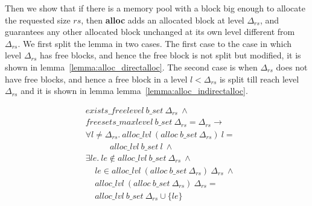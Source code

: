 Then we show that if there is a memory pool with a block big enough to allocate the requested size $rs$, then \textbf{alloc} adds an allocated block at level $\Delta_{rs}$, and guarantees any other allocated block unchanged at its own level different from $\Delta_{rs}$. We first split the lemma in two cases. The first case to the case in which level $\Delta_{rs}$ has free blocks, and hence the free block is not split but modified, it is shown in lemma~\ref{lemma:alloc_directalloc}. The second case is when $\Delta_{rs}$ does not have free blocks, and hence a free block in a level $l < \Delta_{rs}$ is split till reach level $\Delta_{rs}$ and it is shown in lemma lemma~\ref{lemma:alloc_indirectalloc}.


\begin{lemma} 
\label{lemma:alloc_directalloc}
\end{lemma}
\vspace{-7pt}
\begin{align*}
&exists\_freelevel\ b\_set\ \Delta_{rs}\ \wedge\\
&freesets\_maxlevel\ b\_set\ \Delta_{rs} = \Delta_{rs} \longrightarrow\\
&\forall l \ne \Delta_{rs}.\ alloc\_lvl\ (alloc\ b\_set\ \Delta_{rs})\ l =\\
&\ \ \ \ \ \ \ \ \ \ \ \ \ alloc\_lvl\ b\_set\ l\ \wedge\\
&\exists le.\ le \notin alloc\_lvl\ b\_set\ \Delta_{rs}\ \wedge\\
&\ \ \ \ \ le \in alloc\_lvl\ (alloc\ b\_set\ \Delta_{rs})\ \Delta_{rs}\ \wedge\\
&\ \ \ \ \ alloc\_lvl\ (alloc\ b\_set\ \Delta_{rs})\ \Delta_{rs} =\\
&\ \ \ \ \ alloc\_lvl\ b\_set\ \Delta_{rs} \cup \lbrace le \rbrace
\end{align*}
\vspace{-12pt}

